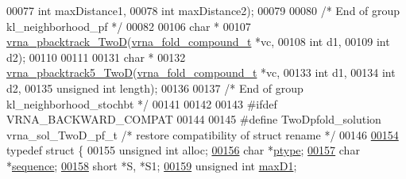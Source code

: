 \begin{DoxyCode}
00077              \textcolor{keywordtype}{int}                  maxDistance1,
00078              \textcolor{keywordtype}{int}                  maxDistance2);
00079 
00080  \textcolor{comment}{/* End of group kl\_neighborhood\_pf */}
00082 
00106 \textcolor{keywordtype}{char} *
00107 \hyperlink{group__kl__neighborhood__stochbt_ga14aceef73f83bbde77bb3a0ca06c9d13}{vrna\_pbacktrack\_TwoD}(\hyperlink{group__fold__compound_structvrna__fc__s}{vrna\_fold\_compound\_t} *vc,
00108                      \textcolor{keywordtype}{int}                  d1,
00109                      \textcolor{keywordtype}{int}                  d2);
00110 
00111 
00131 \textcolor{keywordtype}{char} *
00132 \hyperlink{group__kl__neighborhood__stochbt_ga6504913303bc325659c365d5f59b41e0}{vrna\_pbacktrack5\_TwoD}(\hyperlink{group__fold__compound_structvrna__fc__s}{vrna\_fold\_compound\_t}  *vc,
00133                       \textcolor{keywordtype}{int}                   d1,
00134                       \textcolor{keywordtype}{int}                   d2,
00135                       \textcolor{keywordtype}{unsigned} \textcolor{keywordtype}{int}          length);
00136 
00137  \textcolor{comment}{/* End of group kl\_neighborhood\_stochbt */}
00141 
00142 
00143 \textcolor{preprocessor}{#ifdef  VRNA\_BACKWARD\_COMPAT}
00144 
00145 \textcolor{preprocessor}{#define TwoDpfold\_solution       vrna\_sol\_TwoD\_pf\_t         }\textcolor{comment}{/* restore compatibility of struct rename */}\textcolor{preprocessor}{}
00146 
\hyperlink{structTwoDpfold__vars}{00154} \textcolor{keyword}{typedef} \textcolor{keyword}{struct }\{
00155   \textcolor{keywordtype}{unsigned} \textcolor{keywordtype}{int}          alloc;
\hyperlink{structTwoDpfold__vars_a67f37b8901b8d0a049c216d4c6241b07}{00156}   \textcolor{keywordtype}{char}                  *\hyperlink{structTwoDpfold__vars_a67f37b8901b8d0a049c216d4c6241b07}{ptype};       
\hyperlink{structTwoDpfold__vars_a32c15a1e31856588259556c9020f32c6}{00157}   \textcolor{keywordtype}{char}                  *\hyperlink{structTwoDpfold__vars_a32c15a1e31856588259556c9020f32c6}{sequence};    
\hyperlink{structTwoDpfold__vars_a240311ae1e8e121441651d6101e187ac}{00158}   \textcolor{keywordtype}{short}                 *S, *S1;      
\hyperlink{structTwoDpfold__vars_a7292b6cbc1ee5bacf55e842f316c4bef}{00159}   \textcolor{keywordtype}{unsigned} \textcolor{keywordtype}{int}          \hyperlink{structTwoDpfold__vars_a7292b6cbc1ee5bacf55e842f316c4bef}{maxD1};        

\end{DoxyCode}
